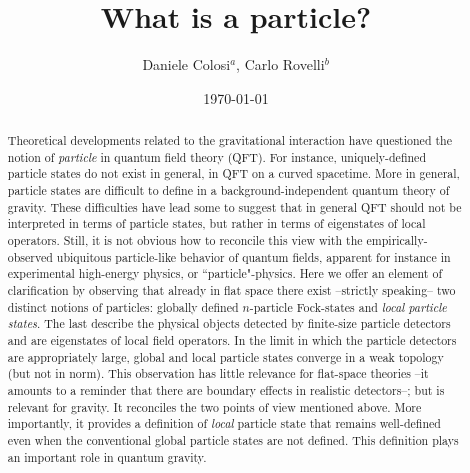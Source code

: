 \documentclass[10pt, nofootinbib]{revtex4}
\begin{document}
\title{\Large\bf What is a particle?}

\author{Daniele Colosi${}^a$, Carlo Rovelli${}^b$}




\bigskip

\date{\small\today} 

\begin{abstract} 
\noindent 

\noindent Theoretical developments related to the gravitational interaction 
have questioned the
notion of \emph{particle} in quantum field theory (QFT).  For
instance, uniquely-defined particle states do not exist in general, 
in QFT on a curved spacetime. More in general, particle
states are difficult to define in a background-independent quantum 
theory of gravity.  These difficulties
have lead some to suggest that in general QFT should not be
interpreted in terms of particle states, but rather in terms of
eigenstates of {local} operators.  Still, it is not
obvious how to reconcile this view with the empirically-observed
ubiquitous particle-like behavior of quantum fields, apparent
for instance in experimental high-energy physics, or ``particle"-physics.  Here we offer
an element of clarification by observing that already in flat space
there exist --strictly speaking-- {two} distinct notions of particles:
globally defined $n$-particle Fock-states and \emph{local particle
states}.  The last describe the physical objects detected by
finite-size particle detectors and  {are}  eigenstates of local
field operators.  In the limit in which the particle detectors are
appropriately large, global and local
particle states converge in a weak topology (but not in norm).  This
observation has little relevance for flat-space 
theories --it amounts to a reminder that there are boundary
effects in realistic detectors--; but is relevant for gravity. It reconciles the two points of
view mentioned above. More importantly, it provides a definition of
{\em local} particle state that remains well-defined even when the conventional
global particle states are not defined.  This definition plays an
important role in quantum gravity.
\end{abstract}
\maketitle
\end{document}
